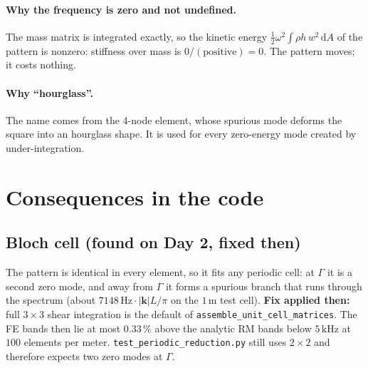 \paragraph{Why the frequency is zero and not undefined.} The mass matrix is integrated
exactly, so the kinetic energy $\frac12\omega^2 \int \rho h\, w^2\,\mathrm{d}A$ of the
pattern is nonzero: stiffness over mass is $0/(\text{positive}) = 0$. The pattern
moves; it costs nothing.

\paragraph{Why ``hourglass''.} The name comes from the 4-node element, whose spurious
mode deforms the square into an hourglass shape. It is used for every
zero-energy mode created by under-integration.

\section{Consequences in the code}

\subsection{Bloch cell (found on Day 2, fixed then)}
The pattern is identical in every element, so it fits any periodic cell: at $\Gamma$
it is a second zero mode, and away from $\Gamma$ it forms a spurious branch that runs
through the spectrum (about $7148\,\mathrm{Hz}\cdot|\mathbf{k}|L/\pi$ on the
$1\,\mathrm{m}$ test cell). \textbf{Fix applied then:} full $3\times 3$ shear
integration is the default of \texttt{assemble\_unit\_cell\_matrices}. The FE bands
then lie at most $0.33\,\%$ above the analytic RM bands below $5\,\mathrm{kHz}$ at
$100$ elements per meter. \texttt{test\_periodic\_reduction.py} still uses $2\times 2$
and therefore expects two zero modes at $\Gamma$.

